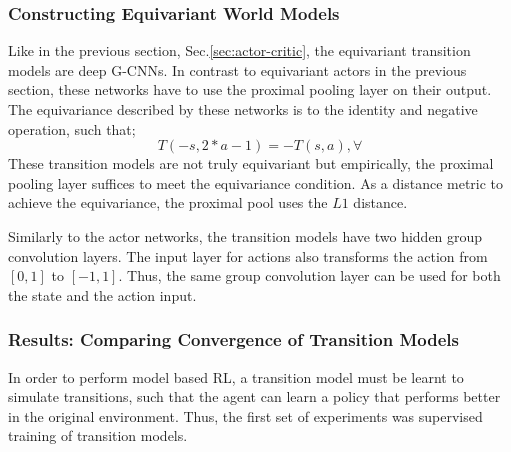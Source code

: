 \subsubsection{Constructing Equivariant World Models}
Like in the previous section, Sec.\ref{sec:actor-critic}, the equivariant transition models are deep G-CNNs. In contrast to equivariant actors in the previous section, these networks have to use the proximal pooling layer on their output. The equivariance described by these networks is to the identity and negative operation, such that;
\begin{equation}
	T(- s, 2*a - 1) =  -T(s, a), \forall
\end{equation}
These transition models are not truly equivariant but empirically, the proximal pooling layer suffices to meet the equivariance condition. As a distance metric to achieve the equivariance, the proximal pool uses the $L1$ distance.

Similarly to the actor networks, the transition models have two hidden group convolution layers. The input layer for actions also transforms the action from $[0, 1]$ to $[-1, 1]$. Thus, the same group convolution layer can be used for both the state and the action input.


\subsubsection{Results: Comparing Convergence of Transition Models}
In order to perform model based RL, a transition model must be learnt to simulate transitions, such that the agent can learn a policy that performs better in the original environment. Thus, the first set of experiments was supervised training of transition models.

